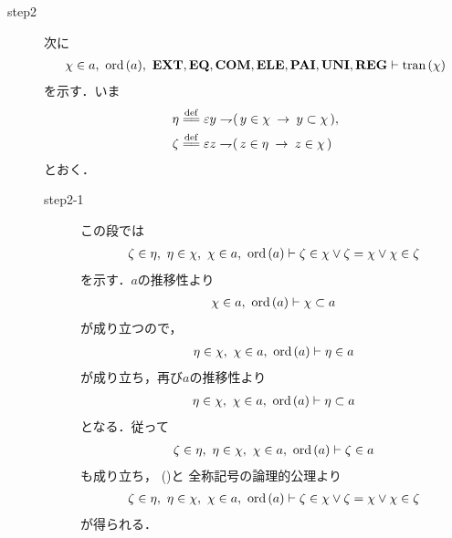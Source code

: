 \begin{sketch}
\begin{description}
			\item[step2] 次に
				\begin{align}
					\chi \in a,\ \ord{a},\ 
					\EXTAX,\EQAX,\COMAX,\ELEAX,\PAIAX,\UNIAX,\REGAX \vdash \tran{\chi}
				\end{align}
				を示す．いま
				\begin{align}
					\eta &\defeq \varepsilon y \negation (\, y \in \chi \rarrow y \subset \chi\, ), \\
					\zeta &\defeq \varepsilon z \negation (\, z \in \eta \rarrow z \in \chi\, )
				\end{align}
				とおく．
				\begin{description}
					\item[step2-1]
						この段では
						\begin{align}
							\zeta \in \eta,\ \eta \in \chi,\ \chi \in a,\ \operatorname*{ord}\hspace{0.15em}(a) 
							\vdash 
							\zeta \in \chi \vee \zeta = \chi \vee \chi \in \zeta
						\end{align}
						を示す．$a$の推移性より
						\begin{align}
							\chi \in a,\ \operatorname*{ord}\hspace{0.15em}(a) \vdash \chi \subset a
						\end{align}
						が成り立つので，
						\begin{align}
							\eta \in \chi,\ \chi \in a,\ \operatorname*{ord}\hspace{0.15em}(a) \vdash \eta \in a
						\end{align}
						が成り立ち，再び$a$の推移性より
						\begin{align}
							\eta \in \chi,\ \chi \in a,\ \operatorname*{ord}\hspace{0.15em}(a) \vdash 
							\eta \subset a
						\end{align}
						となる．従って
						\begin{align}
							\zeta \in \eta,\ \eta \in \chi,\ \chi \in a,\ \operatorname*{ord}\hspace{0.15em}(a) 
							\vdash \zeta \in a
						\end{align}
						も成り立ち，
						()と
						全称記号の論理的公理より
						\begin{align}
							\zeta \in \eta,\ \eta \in \chi,\ \chi \in a,\ \operatorname*{ord}\hspace{0.15em}(a) 
							\vdash 
							\zeta \in \chi \vee \zeta = \chi \vee \chi \in \zeta
							\label{fom:thm_transitive_totally_ordered_class_5}
						\end{align}
						が得られる．
						

\end{description}
\end{description}
\end{sketch}
